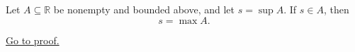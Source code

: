 \begin{proposition}
\label{prop:supremum-in-the-set-is-the-maximum}
Let $A\subseteq\mathbb{R}$ be nonempty and bounded above, and let
$s=\sup A$. If $s\in A$, then
\[
  s=\max A.
\]

\hyperref[prf:supremum-in-the-set-is-the-maximum]{Go to proof.}
\end{proposition}